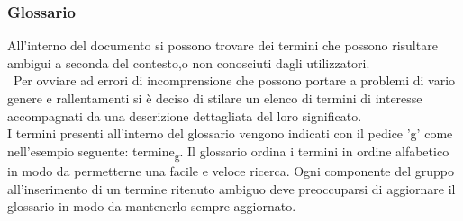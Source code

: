 \subsubsection{Glossario}
All'interno del documento si possono trovare dei termini che possono risultare ambigui a seconda del contesto,o non conosciuti dagli utilizzatori.\\\
Per ovviare ad errori di incomprensione che possono portare a problemi di vario genere e rallentamenti si è deciso di stilare un elenco di termini 
di interesse accompagnati da una descrizione dettagliata del loro significato.\\
I termini presenti all'interno del glossario vengono indicati con il pedice 'g' come nell'esempio seguente: termine\textsubscript{g}.
Il glossario ordina i termini in ordine alfabetico in modo da permetterne una facile e veloce ricerca.
Ogni componente del gruppo all'inserimento di un termine ritenuto ambiguo deve preoccuparsi di aggiornare il glossario in modo da mantenerlo sempre aggiornato.

